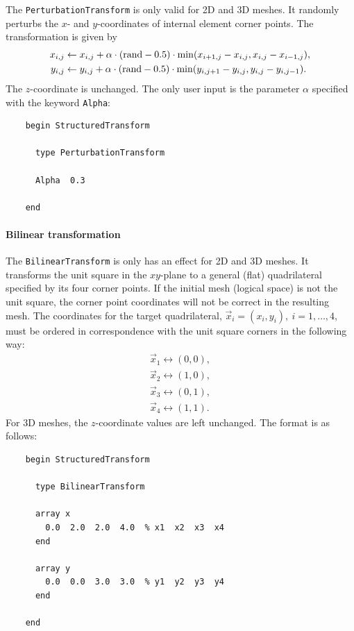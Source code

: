 The \texttt{PerturbationTransform} is only valid for 2D and 3D meshes. 
It randomly perturbs the $x$- and $y$-coordinates of internal element
corner points. The transformation is given by
%
\begin{align}
  x_{i,j} & \leftarrow x_{i,j} + \alpha \cdot (\text{rand} - 0.5)\cdot
  \min(x_{i+1,j}-x_{i,j},
  x_{i,j}-x_{i-1,j}), \\
  y_{i,j} & \leftarrow y_{i,j} + \alpha \cdot (\text{rand} - 0.5)\cdot
  \min(y_{i,j+1}-y_{i,j}, y_{i,j}-y_{i,j-1}). 
\end{align}
%
The $z$-coordinate is unchanged. The only user input is the parameter
$\alpha$ specified with the keyword \texttt{Alpha}:
%
\begin{verbatim}
    begin StructuredTransform

      type PerturbationTransform

      Alpha  0.3

    end
\end{verbatim}
%


\paragraph{Bilinear transformation}
\label{sec:bilin-transf}

The \texttt{BilinearTransform} is only has an effect for 2D and 3D
meshes. It transforms the unit square in the $xy$-plane to a general
(flat) quadrilateral specified by its four corner points. If the
initial mesh (logical space) is not the unit square, the corner point
coordinates will not be correct in the resulting mesh. The coordinates
for the target quadrilateral, $\vec{x}_i = (x_i, y_i),\: i=1,\ldots,
4$, must be ordered in correspondence with the unit square corners in
the following way:
%
\begin{align}
  \vec{x}_1 \leftrightarrow (0,0),\\
  \vec{x}_2 \leftrightarrow (1,0),\\
  \vec{x}_3 \leftrightarrow (0,1),\\
  \vec{x}_4 \leftrightarrow (1,1). 
\end{align}
%
For 3D meshes, the $z$-coordinate values are left unchanged. The
format is as follows:
%
\begin{verbatim}
    begin StructuredTransform

      type BilinearTransform

      array x
        0.0  2.0  2.0  4.0  % x1  x2  x3  x4
      end

      array y
        0.0  0.0  3.0  3.0  % y1  y2  y3  y4
      end

    end
\end{verbatim}
%


